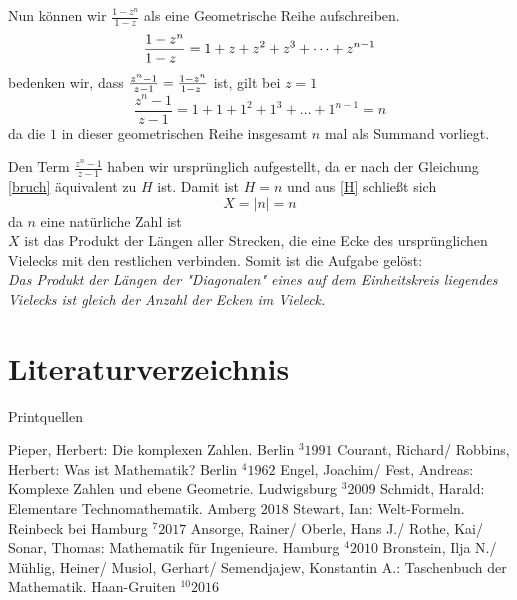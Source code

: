 \documentclass[a4paper,12pt]{article} %
\begin{document}
Nun können wir $\frac{1-z^n}{1-z}$ als eine Geometrische Reihe aufschreiben.
\[\frac{1-z^n}{1-z\hspace{2mm}}=1+z+z^2+z^3+\dots+z^{n-1}\]
bedenken wir, dass $\frac{z^n-1}{z-1}=\frac{1-z^n}{1-z\hspace{1mm}}$ ist, gilt bei $z=1$
\[\frac{z^n-1}{z-1}=1+1+1^2+1^3+\dots+1^{n-1}=n\]
da die $1$ in dieser geometrischen Reihe insgesamt $n$ mal als Summand vorliegt.


Den Term $\frac{z^n-1}{z-1}$ haben wir ursprünglich aufgestellt, da er nach der Gleichung \eqref{bruch} äquivalent zu $H$ ist. Damit ist $H=n$ und aus \eqref{H} schließt sich
\[X=|n|=n\]
da $n$ eine natürliche Zahl ist\\

$X$ ist das Produkt der Längen aller Strecken, die eine Ecke des ursprünglichen Vielecks mit den restlichen verbinden. Somit ist die Aufgabe gelöst:\\

\noindent\emph{Das Produkt der Längen der "Diagonalen" {} eines auf dem Einheitskreis liegendes Vielecks ist gleich der Anzahl der Ecken im Vieleck.}






\newpage
\section{Literaturverzeichnis}




\renewcommand{\refname}{Printquellen}  %

Printquellen

\begin{thebibliography}{9}
	 Pieper, Herbert: Die komplexen Zahlen. Berlin $^3 1991$
	 Courant, Richard/ Robbins, Herbert: Was ist Mathematik? Berlin $^4 1962$
	 Engel, Joachim/ Fest, Andreas: Komplexe Zahlen und ebene Geometrie. Ludwigsburg $^3 2009$
	 Schmidt, Harald: Elementare Technomathematik. Amberg $2018$
	 Stewart, Ian: Welt-Formeln. Reinbeck bei Hamburg  $^7 2017$
	 Ansorge, Rainer/ Oberle, Hans J./ Rothe, Kai/ Sonar, Thomas: Mathematik für Ingenieure. Hamburg $^4 2010$
	 Bronstein, Ilja N./ Mühlig, Heiner/ Musiol, Gerhart/ Semendjajew, Konstantin A.: Taschenbuch der Mathematik. Haan-Gruiten $^{10} 2016$
\end{thebibliography}
\end{document}
